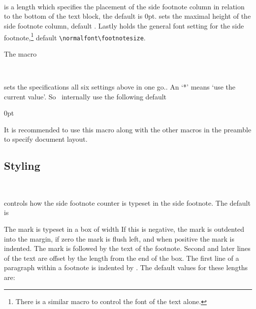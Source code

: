 \documentclass[10pt,a4paper,extrafontsizes]{memoir}
\begin{document}
\begin{syntax}
  \lnc{\sidefootadjust}\\
  \cmd{\setsidefootheight}\\
  \cmd{\sidefootfont}\\
\end{syntax}
\cmd{\sidefootadjust} is a length which specifies the placement of the
side footnote column in relation to the bottom of the text block, the
default is 0pt. \cmd{\setsidefootheight} sets the maximal height of
the side footnote column, default . Lastly
\cmd{\sidefootfont} holds the general font setting for the side
footnote,\footnote{There is a similar macro to control the font of the
  text alone.} default \verb?\normalfont\footnotesize?.


The macro
\begin{syntax}
   \cmd{\setsidefeet}\\
\end{syntax}
sets the specifications all six settings above in one go.. An `*'
means `use the current value'. So \theclass\ internally use the
following default
\begin{lcode}
  \setsidefeet{\marginparsep}{\marginparwidth}%
  {\onelineskip}{0pt}%
  {\normalfont\footnotesize}{\textheight}%
\end{lcode}
It is recommended to use this macro along with the other macros in the
preamble to specify document layout.

\subsection{Styling 
  \texorpdfstring{}{sidefootnote}} 


\begin{syntax}
  \cmd{\sidefootmarkstyle}\\
\end{syntax}
controls how the side footnote counter is typeset in the side
footnote. The default is
\begin{lcode}
\end{lcode}

The mark is typeset in a box of width \lnc{\sidefootmarkwidth}
If this is negative, the mark is outdented
into the margin, if zero the mark is flush left, and when positive
the mark is indented. The mark is followed by the 
text of the footnote. Second and later lines of the
text are offset by the length \lnc{\sidefootmarksep} from the end of the box.
The first line of a paragraph within a footnote is indented by
\lnc{\sidefootparindent}. The default values for these lengths are:
\begin{lcode}
  \setlength{\sidefootmarkwidth}{0em}
  \setlength{\sidefootmarksep}{0em}
  \setlength{\sidefootparindent}{1em}
\end{lcode}
\end{document}
